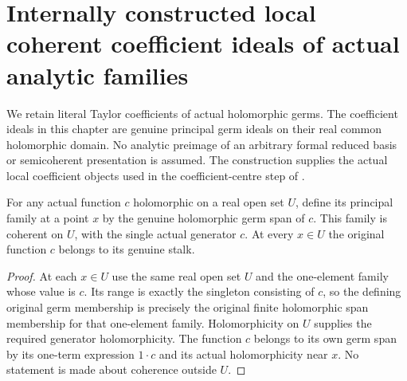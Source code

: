\section{Internally constructed local coherent coefficient ideals of actual analytic families}

We retain literal Taylor coefficients of actual holomorphic germs. The coefficient
ideals in this chapter are genuine principal germ ideals on their real common
holomorphic domain. No analytic preimage of an arbitrary formal reduced basis or
semicoherent presentation is assumed. The construction supplies the actual local
coefficient objects used in the coefficient-centre step of
\cite[Theorem 9.4]{bierstone-milman97-invent-math}.

\begin{lemma}
\label{hir:actual-local-principal-coefficient-ideal}
\leanok
For any actual function $c$ holomorphic on a real open set $U$, define its
principal family at a point $x$ by the genuine holomorphic germ span of $c$.
This family is coherent on $U$, with the single actual generator $c$.
At every $x\in U$ the original function $c$ belongs to its genuine stalk.
\end{lemma}
\begin{proof}
At each $x\in U$ use the same real open set $U$ and the one-element family
whose value is $c$. Its range is exactly the singleton consisting of $c$,
so the defining original germ membership is precisely the original
finite holomorphic span membership for that one-element family. Holomorphicity
on $U$ supplies the required generator holomorphicity. The function $c$
belongs to its own germ span by its one-term expression $1\cdot c$ and its
actual holomorphicity near $x$. No statement is made about coherence outside $U$.
\end{proof}

